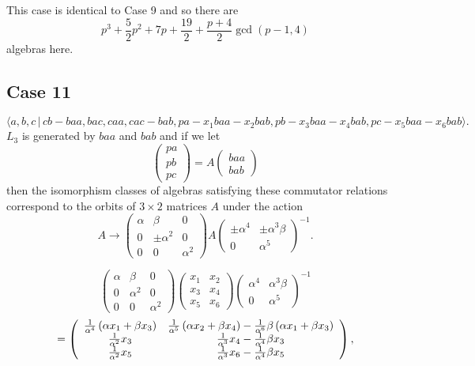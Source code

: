 \documentclass[10pt,thmsa]{article}
\begin{document}
This case is identical to Case 9 and so there are 
\[
p^{3}+\frac{5}{2}p^{2}+7p+\frac{19}{2}+\frac{p+4}{2}\gcd (p-1,4) 
\]%
algebras here.

\subsection{Case 11}

\[
\langle
a,b,c\,|%
\,cb-baa,bac,caa,cac-bab,pa-x_{1}baa-x_{2}bab,pb-x_{3}baa-x_{4}bab,pc-x_{5}baa-x_{6}bab\rangle . 
\]%
$L_{3}$ is generated by $baa$ and $bab$ and if we let 
\[
\left( 
\begin{array}{l}
pa \\ 
pb \\ 
pc%
\end{array}%
\right) =A\left( 
\begin{array}{l}
baa \\ 
bab%
\end{array}%
\right) 
\]%
then the isomorphism classes of algebras satisfying these commutator
relations correspond to the orbits of $3\times 2$ matrices $A$ under the
action 
\[
A\rightarrow \left( 
\begin{array}{lll}
\alpha & \beta & 0 \\ 
0 & \pm \alpha ^{2} & 0 \\ 
0 & 0 & \alpha ^{2}%
\end{array}%
\right) A\left( 
\begin{array}{ll}
\pm \alpha ^{4} & \pm \alpha ^{3}\beta \\ 
0 & \alpha ^{5}%
\end{array}%
\right) ^{-1}. 
\]

\[
\left( 
\begin{array}{lll}
\alpha & \beta & 0 \\ 
0 & \alpha ^{2} & 0 \\ 
0 & 0 & \alpha ^{2}%
\end{array}%
\right) \left( 
\begin{array}{cc}
x_{1} & x_{2} \\ 
x_{3} & x_{4} \\ 
x_{5} & x_{6}%
\end{array}%
\right) \left( 
\begin{array}{ll}
\alpha ^{4} & \alpha ^{3}\beta \\ 
0 & \alpha ^{5}%
\end{array}%
\right) ^{-1} 
\]
\[
=\left( 
\begin{array}{cc}
\frac{1}{\alpha ^{4}}\left( \alpha x_{1}+\beta x_{3}\right) & \frac{1}{%
\alpha ^{5}}\left( \alpha x_{2}+\beta x_{4}\right) -\frac{1}{\alpha ^{6}}%
\beta \left( \alpha x_{1}+\beta x_{3}\right) \\ 
\frac{1}{\alpha ^{2}}x_{3} & \frac{1}{\alpha ^{3}}x_{4}-\frac{1}{\alpha ^{4}}%
\beta x_{3} \\ 
\frac{1}{\alpha ^{2}}x_{5} & \frac{1}{\alpha ^{3}}x_{6}-\frac{1}{\alpha ^{4}}%
\beta x_{5}%
\end{array}%
\right) , 
\]
\end{document}
